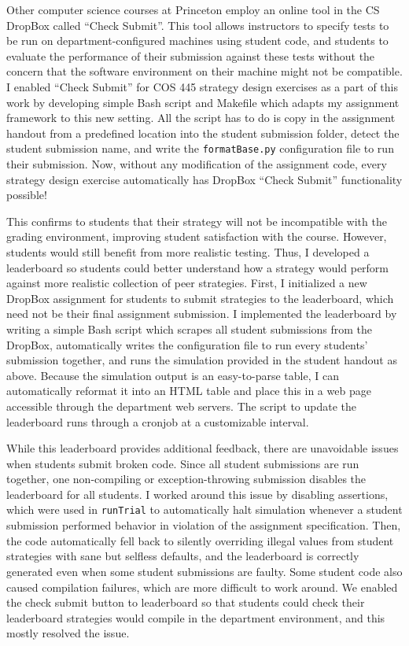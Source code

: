 \documentclass[pageno]{jpaper}
\begin{document}
Other computer science courses at Princeton employ an online tool in the CS DropBox called ``Check Submit''.
This tool allows instructors to specify tests to be run on department-configured machines using student code, and students to evaluate the performance of their submission against these tests without the concern that the software environment on their machine might not be compatible.
I enabled ``Check Submit'' for COS 445 strategy design exercises as a part of this work by developing simple Bash script and Makefile which adapts my assignment framework to this new setting.
All the script has to do is copy in the assignment handout from a predefined location into the student submission folder, detect the student submission name, and write the \texttt{formatBase.py} configuration file to run their submission.
Now, without any modification of the assignment code, every strategy design exercise automatically has DropBox ``Check Submit'' functionality possible!

This confirms to students that their strategy will not be incompatible with the grading environment, improving student satisfaction with the course.
However, students would still benefit from more realistic testing.
Thus, I developed a leaderboard so students could better understand how a strategy would perform against more realistic collection of peer strategies.
First, I initialized a new DropBox assignment for students to submit strategies to the leaderboard, which need not be their final assignment submission.
I implemented the leaderboard by writing a simple Bash script which scrapes all student submissions from the DropBox, automatically writes the configuration file to run every students' submission together, and runs the simulation provided in the student handout as above.
Because the simulation output is an easy-to-parse table, I can automatically reformat it into an HTML table and place this in a web page accessible through the department web servers.
The script to update the leaderboard runs through a cronjob at a customizable interval.

While this leaderboard provides additional feedback, there are unavoidable issues when students submit broken code.
Since all student submissions are run together, one non-compiling or exception-throwing submission disables the leaderboard for all students.
I worked around this issue by disabling assertions, which were used in \texttt{runTrial} to automatically halt simulation whenever a student submission performed behavior in violation of the assignment specification.
Then, the code automatically fell back to silently overriding illegal values from student strategies with sane but selfless defaults, and the leaderboard is correctly generated even when some student submissions are faulty.
Some student code also caused compilation failures, which are more difficult to work around.
We enabled the check submit button to leaderboard so that students could check their leaderboard strategies would compile in the department environment, and this mostly resolved the issue.
\end{document}
